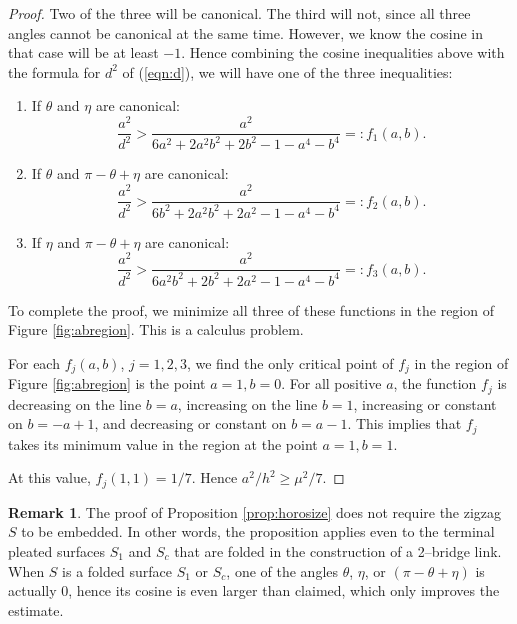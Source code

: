 \documentclass[11pt]{amsart}
\theoremstyle{plain}
\theoremstyle{definition}
\newtheorem*{remark}{Remark}
\begin{document}
\begin{proof}
Two of the three will be canonical.  The third will not, since all
three angles cannot be canonical at the same time.  However, we know
the cosine in that case will be at least $-1$.  Hence combining the
cosine inequalities above with the formula for $d^2$ of (\ref{eqn:d}),
we will have one of the three inequalities:
\begin{enumerate}
	\item If $\theta$ and $\eta$ are canonical:
$$ \frac{a^2}{d^2} >
		\frac{a^2}{6a^2+2a^2b^2+2b^2-1-a^4-b^4} =: f_1(a,b).$$ 
	\item If $\theta$ and $\pi-\theta+\eta$ are canonical:
$$\frac{a^2}{d^2} >
		\frac{a^2}{6b^2 + 2a^2b^2 + 2a^2 -1-a^4-b^4}=:f_2(a,b).$$
	\item If $\eta$ and $\pi-\theta+\eta$ are canonical:
$$\frac{a^2}{d^2} >
		\frac{a^2}{6a^2b^2+2b^2+2a^2 -1-a^4-b^4} =:f_3(a,b).$$
\end{enumerate}

To complete the proof, we minimize all three of these functions in the
region of Figure \ref{fig:abregion}.  This is a calculus problem.

For each $f_j(a,b)$, $j=1, 2, 3$, we find the only critical point of
$f_j$ in the region of Figure \ref{fig:abregion} is the point $a=1,
b=0$.  For all positive $a$, the function $f_j$ is decreasing on the
line $b=a$, increasing on the line $b=1$, increasing or constant on
$b=-a+1$, and decreasing or constant on $b=a-1$.  This implies that
$f_j$ takes its minimum value in the region at the point $a=1, b=1$.

At this value, $f_j(1,1) = 1/7$.  Hence $a^2/h^2 \geq \mu^2/7$.  
\end{proof}

\begin{remark}
The proof of Proposition \ref{prop:horosize} does not require the
zigzag $S$ to be embedded.  In other words, the proposition applies
even to the terminal pleated surfaces $S_1$ and $S_c$ that are folded
in the construction of a 2--bridge link.  When $S$ is a folded surface
$S_1$ or $S_c$, one of the angles $\theta$, $\eta$, or $(\pi - \theta
+ \eta)$ is actually $0$, hence its cosine is even larger than
claimed, which only improves the estimate.
\end{remark}
\end{document}
